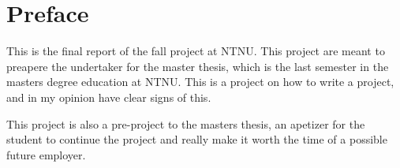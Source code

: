 \chapter{Preface}
	This is the final report of the fall project at NTNU. This project are meant to preapere the
	undertaker for the master thesis, which is the last semester in the masters degree education at NTNU.
	This is a project on how to write a project, and in my opinion have clear signs of this. 

	This project is also a pre-project to the masters thesis, an apetizer for the student to continue the
	project and really make it worth the time of a possible future employer.


